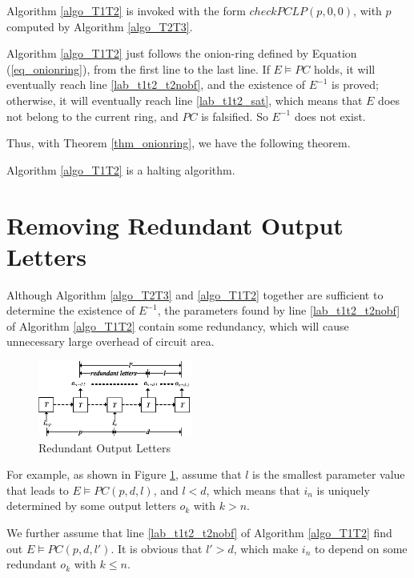 \documentclass[journal]{IEEEtran}
\begin{document}
Algorithm \ref{algo_T1T2} is invoked with the form $checkPCLP(p,0,0)$,
with $p$ computed by Algorithm \ref{algo_T2T3}.

Algorithm \ref{algo_T1T2} just follows the onion-ring defined by Equation (\ref{eq_onionring}),
from the first line to the last line.
If $E\vDash PC$ holds,
it will eventually reach line \ref{lab_t1t2_t2nobf},
and the existence of $E^{-1}$ is proved;
otherwise,
it will eventually reach line \ref{lab_t1t2_sat},
which means that $E$ does not belong to the current ring,
and $PC$ is falsified.
So $E^{-1}$ does not exist.

Thus,
with Theorem \ref{thm_onionring},
we have the following theorem.

\begin{theorem}\label{a2h}
Algorithm \ref{algo_T1T2} is a halting algorithm.
\end{theorem}

\section{Removing Redundant Output Letters}\label{sec_rmred}
Although Algorithm \ref{algo_T2T3} and \ref{algo_T1T2} together are sufficient to determine the existence of $E^{-1}$,
the parameters found by line \ref{lab_t1t2_t2nobf} of Algorithm \ref{algo_T1T2} contain some redundancy,
which will cause unnecessary large overhead of circuit area.

\begin{figure}[b]
\begin{center}
\includegraphics[width=0.45\textwidth]{rmred}
\end{center}
\caption{Redundant Output Letters}
  \label{fig_rmred}
\end{figure}

For example,
as shown in Figure \ref{fig_rmred},
assume that $l$ is the smallest parameter value that leads to $E\vDash PC(p,d,l)$,
and $l<d$,
which means that $i_n$ is uniquely determined by some output letters $o_k$ with $k>n$.

We further assume that line \ref{lab_t1t2_t2nobf} of Algorithm \ref{algo_T1T2} find out $E\vDash PC(p,d,l')$.
It is obvious that $l'>d$,
which make $i_n$ to depend on some redundant $o_k$ with $k\le n$.
\end{document}
